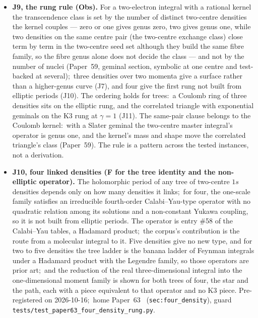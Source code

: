 \documentclass[11pt,a4paper]{article}
\theoremstyle{plain}
\theoremstyle{definition}
\begin{document}
\begin{itemize}
  \item \textbf{J9, the rung rule (Obs).} For a two-electron integral with a rational kernel the transcendence class is set by the number of distinct two-centre densities the kernel couples --- zero or one gives genus zero, two gives genus one, while two densities on the same centre pair (the two-centre exchange class) close term by term in the two-centre seed set although they build the same fibre family, so the fibre genus alone does not decide the class --- and not by the number of nuclei (Paper~59, geminal section, symbolic at one centre and test-backed at several);\ three densities over two momenta give a surface rather than a higher-genus curve (J7), and four give the first rung not built from elliptic periods (J10). The ordering holds for trees:\ a Coulomb ring of three densities sits on the elliptic rung, and the correlated triangle with exponential geminals on the K3 rung at $\gamma=1$ (J11). The same-pair clause belongs to the Coulomb kernel:\ with a Slater geminal the two-centre master integral's operator is genus one, and the kernel's mass and shape move the correlated triangle's class (Paper~59). The rule is a pattern across the tested instances, not a derivation.
  \item \textbf{J10, four linked densities (F for the tree identity and the non-elliptic operator).} The holomorphic period of any tree of two-centre $1s$ densities depends only on how many densities it links;\ for four, the one-scale family satisfies an irreducible fourth-order Calabi--Yau-type operator with no quadratic relation among its solutions and a non-constant Yukawa coupling, so it is not built from elliptic periods. The operator is entry \#58 of the Calabi--Yau tables, a Hadamard product;\ the corpus's contribution is the route from a molecular integral to it. Five densities give no new type, and for two to five densities the tree ladder is the banana ladder of Feynman integrals under a Hadamard product with the Legendre family, so those operators are prior art;\ and the reduction of the real three-dimensional integral into the one-dimensional moment family is shown for both trees of four, the star and the path, each with a piece equivalent to that operator and no K3 piece. Pre-registered on 2026-10-16;\ home Paper~63~\cite{paper63} (\texttt{sec:four\_density}), guard \texttt{tests/test\_paper63\_four\_density\_rung.py}.

\end{itemize}
\end{document}
